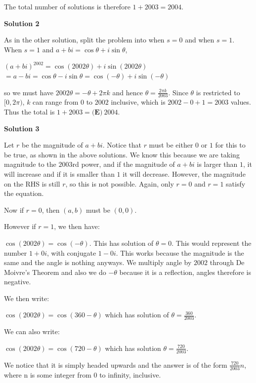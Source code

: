 \begin{enumerate}
 The total number of solutions is therefore $1+2003 = \boxed{2004}$.

 



\textbf{Solution 2}

As in the other solution, split the problem into when $s=0$ and when $s=1$. When $s=1$ and $a+bi=\cos\theta+i\sin\theta$,

 $(a+bi)^{2002}= \cos(2002\theta)+i\sin(2002\theta)$ $=a-bi= \cos\theta-i\sin\theta= \cos(-\theta)+i\sin(-\theta)$

 so we must have $2002\theta=-\theta+2\pi k$ and hence $\theta=\frac{2\pi k}{2003}$. Since $\theta$ is restricted to $[0,2\pi)$, $k$ can range from $0$ to $2002$ inclusive, which is $2002-0+1=2003$ values. Thus the total is $1+2003 = \boxed{\textbf{(E)}\  2004}$.

 



\textbf{Solution 3}

Let $r$ be the magnitude of $a+bi$. Notice that $r$ must be either $0$ or $1$ for this to be true, as shown in the above solutions. We know this because we are taking magnitude to the $2003$rd power, and if the magnitude of $a+bi$ is larger than $1$, it will increase and if it is smaller than $1$ it will decrease. However, the magnitude on the RHS is still $r$, so this is not possible. Again, only $r=0$ and $r=1$ satisfy the equation.

 Now if $r=0$, then $(a,b)$ must be $(0,0)$.

 However if $r=1$, we then have:

 $\cos(2002 \theta) = \cos(-\theta)$. This has solution of $\theta = 0$. This would represent the number $1+0i$, with conjugate $1-0i$. This works because the magnitude is the same and the angle is nothing anyways. We multiply angle by $2002$ through De Moivre's Theorem and also we do $-\theta$ because it is a reflection, angles therefore is negative.

 We then write:

 $\cos(2002 \theta) = \cos(360-\theta)$ which has solution of $\theta = \frac{360}{2003}$. 

 We can also write:

 $\cos(2002 \theta) = \cos(720-\theta)$ which has solution $\theta = \frac{720}{2003}$.

 We notice that it is simply headed upwards and the answer is of the form $\frac{720}{2003} n$, where n is some integer from $0$ to infinity, inclusive.


\end{enumerate}
